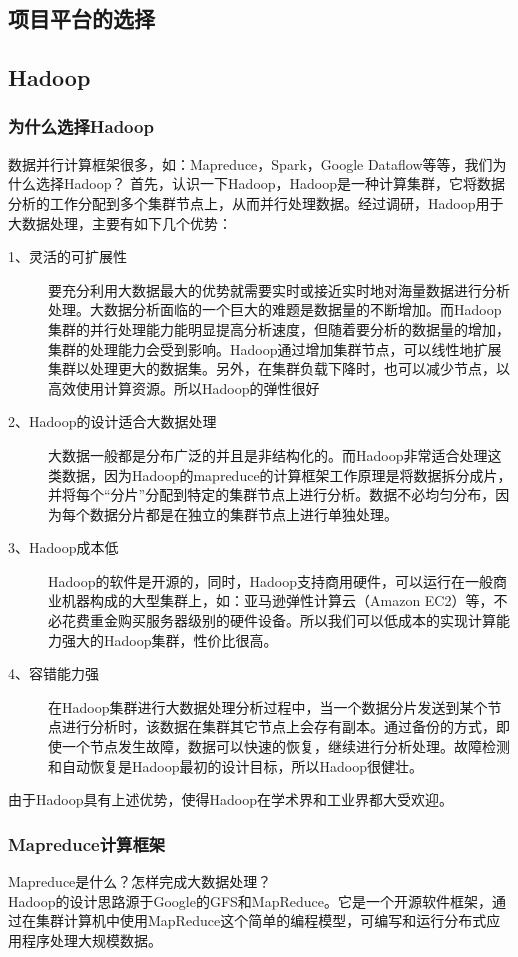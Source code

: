 \documentclass[a4paper, 11pt]{article}                                                   %
\begin{document}
\begin{CJK*}{UTF8}{song}
\section{项目平台的选择}
\subsection{Hadoop}
\subsubsection{为什么选择Hadoop}
数据并行计算框架很多，如：Mapreduce，Spark，Google Dataflow等等，我们为什么选择Hadoop？
首先，认识一下Hadoop，Hadoop是一种计算集群，它将数据分析的工作分配到多个集群节点上，从而并行处理数据。经过调研，Hadoop用于大数据处理，主要有如下几个优势：
\begin{description}
  \item[1、灵活的可扩展性] 要充分利用大数据最大的优势就需要实时或接近实时地对海量数据进行分析处理。大数据分析面临的一个巨大的难题是数据量的不断增加。而Hadoop集群的并行处理能力能明显提高分析速度，但随着要分析的数据量的增加，集群的处理能力会受到影响。Hadoop通过增加集群节点，可以线性地扩展集群以处理更大的数据集。另外，在集群负载下降时，也可以减少节点，以高效使用计算资源。所以Hadoop的弹性很好
  \item[2、Hadoop的设计适合大数据处理] 大数据一般都是分布广泛的并且是非结构化的。而Hadoop非常适合处理这类数据，因为Hadoop的mapreduce的计算框架工作原理是将数据拆分成片，并将每个“分片”分配到特定的集群节点上进行分析。数据不必均匀分布，因为每个数据分片都是在独立的集群节点上进行单独处理。
  \item[3、Hadoop成本低] Hadoop的软件是开源的，同时，Hadoop支持商用硬件，可以运行在一般商业机器构成的大型集群上，如：亚马逊弹性计算云（Amazon EC2）等，不必花费重金购买服务器级别的硬件设备。所以我们可以低成本的实现计算能力强大的Hadoop集群，性价比很高。
  \item[4、容错能力强] 在Hadoop集群进行大数据处理分析过程中，当一个数据分片发送到某个节点进行分析时，该数据在集群其它节点上会存有副本。通过备份的方式，即使一个节点发生故障，数据可以快速的恢复，继续进行分析处理。故障检测和自动恢复是Hadoop最初的设计目标，所以Hadoop很健壮。
\end{description}
由于Hadoop具有上述优势，使得Hadoop在学术界和工业界都大受欢迎。\\
\subsubsection{Mapreduce计算框架}
Mapreduce是什么？怎样完成大数据处理？\\
Hadoop的设计思路源于Google的GFS和MapReduce。它是一个开源软件框架，通过在集群计算机中使用MapReduce这个简单的编程模型，可编写和运行分布式应用程序处理大规模数据。


\end{CJK*}
\end{document}
